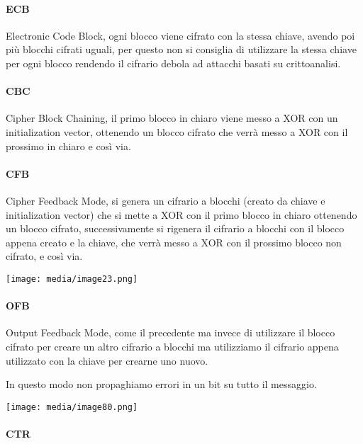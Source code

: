 \paragraph{ECB}\label{ecb}

Electronic Code Block, ogni blocco viene cifrato con la stessa chiave,
avendo poi più blocchi cifrati uguali, per questo non si consiglia di
utilizzare la stessa chiave per ogni blocco rendendo il cifrario debola
ad attacchi basati su crittoanalisi.

\paragraph{CBC}\label{cbc}

Cipher Block Chaining, il primo blocco in chiaro viene messo a XOR con
un initialization vector, ottenendo un blocco cifrato che verrà messo a
XOR con il prossimo in chiaro e così via.

\paragraph{CFB}\label{cfb}

Cipher Feedback Mode, si genera un cifrario a blocchi (creato da chiave
e initialization vector) che si mette a XOR con il primo blocco in
chiaro ottenendo un blocco cifrato, successivamente si rigenera il
cifrario a blocchi con il blocco appena creato e la chiave, che verrà
messo a XOR con il prossimo blocco non cifrato, e così via.

\texttt{[image: media/image23.png]}

\paragraph{OFB}\label{ofb}

Output Feedback Mode, come il precedente ma invece di utilizzare il
blocco cifrato per creare un altro cifrario a blocchi ma utilizziamo il
cifrario appena utilizzato con la chiave per crearne uno nuovo.

In questo modo non propaghiamo errori in un bit su tutto il messaggio.

\texttt{[image: media/image80.png]}

\paragraph{CTR}\label{ctr}

